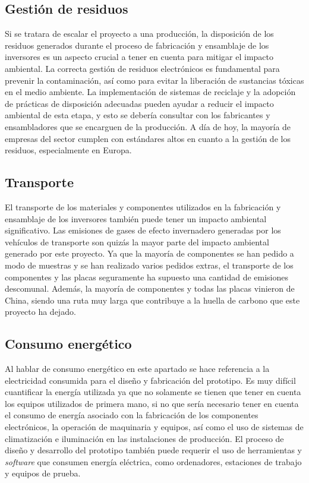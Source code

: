 \subsection*{Gestión de residuos}

Si se tratara de escalar el proyecto a una producción, la disposición de los residuos generados durante el proceso de fabricación y ensamblaje de los inversores es un aspecto crucial a tener en cuenta para mitigar el impacto ambiental. La correcta gestión de residuos electrónicos es fundamental para prevenir la contaminación, así como para evitar la liberación de sustancias tóxicas en el medio ambiente. La implementación de sistemas de reciclaje y la adopción de prácticas de disposición adecuadas pueden ayudar a reducir el impacto ambiental de esta etapa, y esto se debería consultar con los fabricantes y ensambladores que se encarguen de la producción. A día de hoy, la mayoría de empresas del sector cumplen con estándares altos en cuanto a la gestión de los residuos, especialmente en Europa.

\subsection*{Transporte}

El transporte de los materiales y componentes utilizados en la fabricación y ensamblaje de los inversores también puede tener un impacto ambiental significativo. Las emisiones de gases de efecto invernadero generadas por los vehículos de transporte son quizás la mayor parte del impacto ambiental generado por este proyecto. Ya que la mayoría de componentes se han pedido a modo de muestras y se han realizado varios pedidos extras, el transporte de los componentes y las placas seguramente ha supuesto una cantidad de emisiones descomunal. Además, la mayoría de componentes y todas las placas vinieron de China, siendo una ruta muy larga que contribuye a la huella de carbono que este proyecto ha dejado.

\subsection*{Consumo energético}

Al hablar de consumo energético en este apartado se hace referencia a la electricidad consumida para el diseño y fabricación del prototipo. Es muy difícil cuantificar la energía utilizada ya que no solamente se tienen que tener en cuenta los equipos utilizados de primera mano, si no que sería necesario tener en cuenta el consumo de energía asociado con la fabricación de los componentes electrónicos, la operación de maquinaria y equipos, así como el uso de sistemas de climatización e iluminación en las instalaciones de producción. El proceso de diseño y desarrollo del prototipo también puede requerir el uso de herramientas y \textit{software} que consumen energía eléctrica, como ordenadores, estaciones de trabajo y equipos de prueba.


